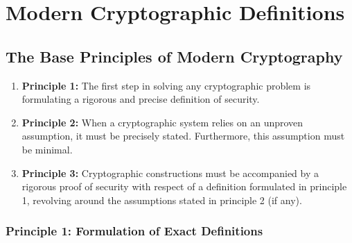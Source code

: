 \chapter{Modern Cryptographic Definitions}


\section{The Base Principles of Modern Cryptography}

\begin{enumerate}
    \item \textbf{Principle 1:} \textcolor{R}{The first step in solving any cryptographic problem is formulating a rigorous and precise
definition of security.}
    \item \textbf{Principle 2:} \textcolor{B}{When a cryptographic system relies on an unproven assumption, it must be precisely
stated. Furthermore, this assumption must be minimal.}
    \item \textbf{Principle 3:} \textcolor{G}{Cryptographic constructions must be accompanied by a rigorous proof of security
with respect of a definition formulated in principle 1, revolving around the assumptions stated in
principle 2 (if any).}
\end{enumerate}

\subsection{Principle 1: Formulation of Exact Definitions}

